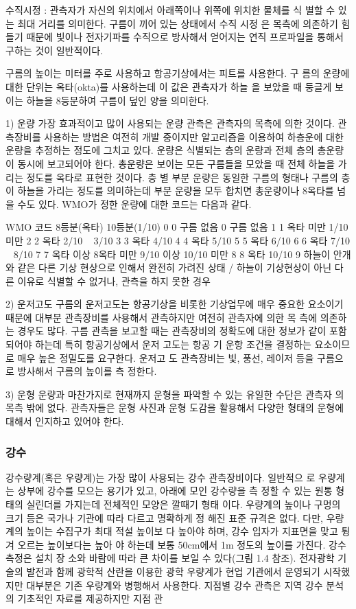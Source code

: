 수직시정 : 관측자가 자신의 위치에서 아래쪽이나 위쪽에 위치한 물체를 식
별할 수 있는 최대 거리를 의미한다. 구름이 끼어 있는 상태에서 수직 시정
은 목측에 의존하기 힘들기 때문에 빛이나 전자기파를 수직으로 방사해서
얻어지는 연직 프로파일을 통해서 구하는 것이 일반적이다.

구름의 높이는 미터를 주로 사용하고 항공기상에서는 피트를 사용한다. 구
름의 운량에 대한 단위는 옥타(okta)를 사용하는데 이 값은 관측자가 하늘
을 보았을 때 둥글게 보이는 하늘을 8등분하여 구름이 덮인 양을 의미한다.

1) 운량
가장 효과적이고 많이 사용되는 운량 관측은 관측자의 목측에 의한 것이다.
관측장비를 사용하는 방법은 여전히 개발 중이지만 알고리즘을 이용하여
하층운에 대한 운량을 추정하는 정도에 그치고 있다. 운량은 식별되는 층의
운량과 전체 층의 총운량이 동시에 보고되어야 한다. 총운량은 보이는 모든
구름들을 모았을 때 전체 하늘을 가리는 정도를 옥타로 표현한 것이다. 층
별 부분 운량은 동일한 구름의 형태나 구름의 층이 하늘을 가리는 정도를
의미하는데 부분 운량을 모두 합치면 총운량이나 8옥타를 넘을 수도 있다.
WMO가 정한 운량에 대한 코드는 다음과 같다.

WMO 코드 8등분(옥타) 10등분(1/10)
0 0 구름 없음 0 구름 없음
1 1 옥타 미만 1/10 미만
2 2 옥타 2/10 ~ 3/10
3 3 옥타 4/10
4 4 옥타 5/10
5 5 옥타 6/10
6 6 옥타 7/10 ~ 8/10
7 7 옥타 이상 8옥타 미만 9/10 이상 10/10 미만
8 8 옥타 10/10
9 하늘이 안개와 같은 다른 기상 현상으로 인해서 완전히 가려진 상태
/ 하늘이 기상현상이 아닌 다른 이유로 식별할 수 없거나, 관측을 하지 못한 경우

2) 운저고도
구름의 운저고도는 항공기상을 비롯한 기상업무에 매우 중요한 요소이기
때문에 대부분 관측장비를 사용해서 관측하지만 여전히 관측자에 의한 목
측에 의존하는 경우도 많다. 구름 관측을 보고할 때는 관측장비의 정확도에
대한 정보가 같이 포함되어야 하는데 특히 항공기상에서 운저 고도는 항공
기 운항 조건을 결정하는 요소이므로 매우 높은 정밀도를 요구한다. 운저고
도 관측장비는 빛, 풍선, 레이저 등을 구름으로 방사해서 구름의 높이를 측
정한다.


3) 운형
운량과 마찬가지로 현재까지 운형을 파악할 수 있는 유일한 수단은 관측자
의 목측 밖에 없다. 관측자들은 운형 사진과 운형 도감을 활용해서 다양한
형태의 운형에 대해서 인지하고 있어야 한다.

\subsubsection{강수}

강수량계(혹은 우량계)는 가장 많이 사용되는 강수 관측장비이다. 일반적으
로 우량계는 상부에 강수를 모으는 용기가 있고, 아래에 모인 강수량을 측
정할 수 있는 원통 형태의 실린더를 가지는데 전체적인 모양은 깔때기 형태
이다.
우량계의 높이나 구멍의 크기 등은 국가나 기관에 따라 다르고 명확하게 정
해진 표준 규격은 없다. 다만, 우량계의 높이는 수집구가 최대 적설 높이보
다 높아야 하며, 강수 입자가 지표면을 맞고 튕겨 오르는 높이보다는 높아
야 하는데 보통 50cm에서 1m 정도의 높이를 가진다. 강수 측정은 설치 장
소와 바람에 따라 큰 차이를 보일 수 있다(그림 1.4 참조). 전자광학 기술의
발전과 함께 광학적 산란을 이용한 광학 우량계가 현업 기관에서 운영되기
시작했지만 대부분은 기존 우량계와 병행해서 사용한다.
지점별 강수 관측은 지역 강수 분석의 기초적인 자료를 제공하지만 지점 관

